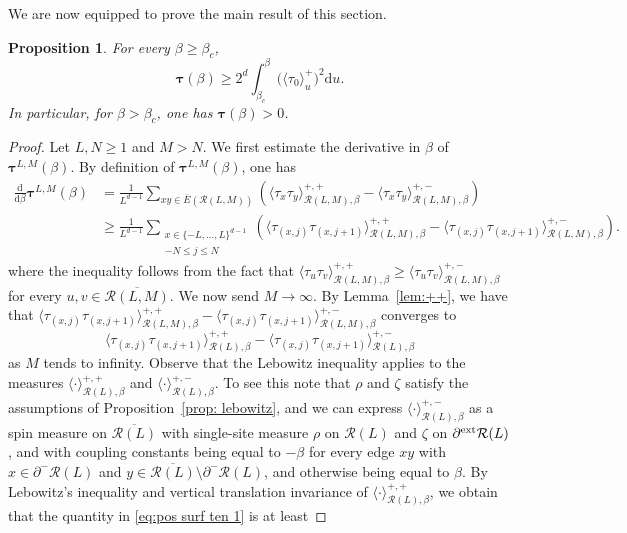 \documentclass[11pt,a4paper]{article}
\numberwithin{equation}{section}
\theoremstyle{plain}
\newtheorem{Prop}[Thm]{Proposition}
\theoremstyle{definition}
\begin{document}
We are now equipped to prove the main result of this section.
\begin{Prop}\label{prop: positivity of tau}
For every $\beta \geq \beta_c$,
\begin{equation}
\boldsymbol{\tau}(\beta) \geq 2^d\int_{\beta_c}^\beta \big(\langle \tau_0 \rangle_u^+\big)^2 \mathrm{d}u.  
\end{equation}
In particular, for $\beta>\beta_c$, one has $\boldsymbol{\tau}(\beta)>0$.
\end{Prop}


\begin{proof}
Let $L, N\geq 1$ and $M> N$. We first estimate the derivative in $\beta$ of  $\boldsymbol{\tau}^{L,M}(\beta)$. By definition of $\boldsymbol{\tau}^{L,M}(\beta)$, one has
\begin{equation}\label{eq:pos surf ten 0}
\begin{aligned}
\frac{\mathrm{d}}{\mathrm{d}\beta}\boldsymbol{\tau}^{L,M} (\beta)&=\frac{1}{L^{d-1}} \sum_{xy\in \overline{E}(\mathcal R(L,M))} \left(\langle \tau_x\tau_y \rangle^{+,+}_{\mathcal R(L,M),\beta} - \langle \tau_x\tau_y \rangle^{+,-}_{\mathcal R(L,M),\beta}\right)
\\&\geq \frac{1}{L^{d-1}}\sum_{\substack{x\in \{-L,\ldots,L\}^{d-1}\\ -N\leq j\leq N}} \left( \langle \tau_{(x,j)} \tau_{(x,j+1)} \rangle_{\mathcal R(L,M), \beta}^{+,+} -  \langle \tau_{(x,j)} \tau_{(x,j+1)} \rangle_{\mathcal R(L,M), \beta}^{+,-}  \right).
\end{aligned}
\end{equation}
where the inequality follows from the fact that $\langle \tau_u\tau_v\rangle^{+,+}_{\mathcal{R}(L,M),\beta}\geq \langle \tau_u\tau_v\rangle^{+,-}_{\mathcal{R}(L,M),\beta}$ for every $u,v\in \overline{\mathcal{R}(L,M)}$.
We now send $M\to\infty$.
By Lemma~\ref{lem:++}, we have that $\langle \tau_{(x,j)} \tau_{(x,j+1)} \rangle_{\mathcal R(L,M), \beta}^{+,+} -  \langle \tau_{(x,j)} \tau_{(x,j+1)} \rangle_{\mathcal R(L,M), \beta}^{+,-}$ converges to 
\begin{equation}\label{eq:pos surf ten 1}
\langle \tau_{(x,j)} \tau_{(x,j+1)} \rangle_{\mathcal R(L), \beta}^{+,+} -  \langle \tau_{(x,j)} \tau_{(x,j+1)} \rangle_{\mathcal R(L), \beta}^{+,-}
\end{equation}
as $M$ tends to infinity.
Observe that the Lebowitz inequality applies to the measures $\langle \cdot \rangle^{+,+}_{\mathcal{R}(L),\beta}$ and $\langle \cdot\rangle^{+,-}_{\mathcal{R}(L),\beta}$. To see this note that $\rho$ and $\zeta$ satisfy the assumptions of Proposition~\ref{prop: lebowitz}, and we can express $\langle \cdot\rangle^{+,-}_{\mathcal{R}(L),\beta}$ as a spin measure on $\overline{\mathcal{R}(L)}$ with single-site measure $\rho$ on $\mathcal{R}(L)$ and $\zeta$ on $\partial^{\textup{ext}}\mathcal{R}(L)$, and with coupling constants being equal to $-\beta$ for every edge $xy$ with $x\in \partial^-\mathcal{R}(L)$ and $y\in \overline{\mathcal{R}(L)}\setminus \partial^-\mathcal{R}(L)$, and otherwise being equal to $\beta$.  By Lebowitz's inequality and vertical translation invariance of $\langle \cdot \rangle^{+,+}_{\mathcal{R}(L),\beta}$, we obtain that the quantity in \eqref{eq:pos surf ten 1} is at least

\end{proof}
\end{document}
